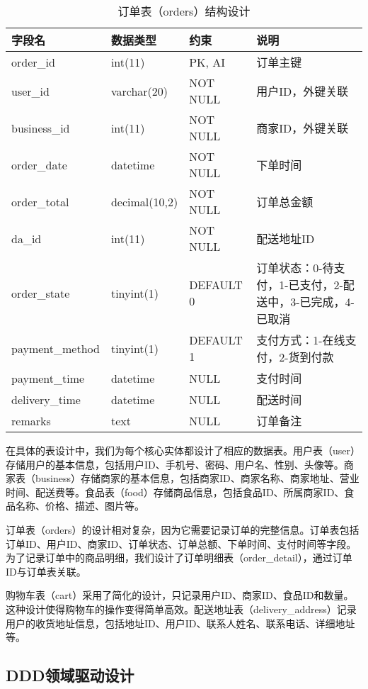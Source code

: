 \documentclass[a4paper,12pt]{article}
\begin{document}
\begin{table}[H]
\centering
\caption{订单表（orders）结构设计}
\begin{tabular}{|p{3cm}|p{2cm}|p{1.5cm}|p{6cm}|}
\hline
\textbf{字段名} & \textbf{数据类型} & \textbf{约束} & \textbf{说明} \\
\hline
order\_id & int(11) & PK, AI & 订单主键 \\
\hline
user\_id & varchar(20) & NOT NULL & 用户ID，外键关联 \\
\hline
business\_id & int(11) & NOT NULL & 商家ID，外键关联 \\
\hline
order\_date & datetime & NOT NULL & 下单时间 \\
\hline
order\_total & decimal(10,2) & NOT NULL & 订单总金额 \\
\hline
da\_id & int(11) & NOT NULL & 配送地址ID \\
\hline
order\_state & tinyint(1) & DEFAULT 0 & 订单状态：0-待支付，1-已支付，2-配送中，3-已完成，4-已取消 \\
\hline
payment\_method & tinyint(1) & DEFAULT 1 & 支付方式：1-在线支付，2-货到付款 \\
\hline
payment\_time & datetime & NULL & 支付时间 \\
\hline
delivery\_time & datetime & NULL & 配送时间 \\
\hline
remarks & text & NULL & 订单备注 \\
\hline
\end{tabular}
\end{table}

在具体的表设计中，我们为每个核心实体都设计了相应的数据表。用户表（user）存储用户的基本信息，包括用户ID、手机号、密码、用户名、性别、头像等。商家表（business）存储商家的基本信息，包括商家ID、商家名称、商家地址、营业时间、配送费等。食品表（food）存储商品信息，包括食品ID、所属商家ID、食品名称、价格、描述、图片等。

订单表（orders）的设计相对复杂，因为它需要记录订单的完整信息。订单表包括订单ID、用户ID、商家ID、订单状态、订单总额、下单时间、支付时间等字段。为了记录订单中的商品明细，我们设计了订单明细表（order_detail），通过订单ID与订单表关联。

购物车表（cart）采用了简化的设计，只记录用户ID、商家ID、食品ID和数量。这种设计使得购物车的操作变得简单高效。配送地址表（delivery_address）记录用户的收货地址信息，包括地址ID、用户ID、联系人姓名、联系电话、详细地址等。

\subsection{DDD领域驱动设计}
\end{document}
